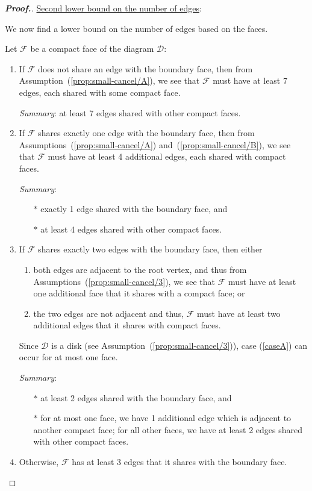 \documentclass[11pt,a4paper,reqno]{amsart}
\theoremstyle{plain}
\theoremstyle{definition}
\theoremstyle{definition}
\newenvironment{myproof}{\begin{proof}[\normalfont\bfseries Proof.]}{\end{proof}}
\begin{document}
\begin{myproof}
	\medskip
	\noindent
	\underline{Second lower bound on the number of edges}:\nopagebreak

	\smallskip\nopagebreak
	\noindent\nopagebreak
	We now find a lower bound on the number of edges based on the faces.

	Let $\mathcal F$ be a compact face of the diagram $\mathcal D$:
	\begin{enumerate}[label=(\roman*),ref=\roman*]
		\item
		      If $\mathcal F$ does not share an edge with the boundary face, then from Assumption~(\ref{prop:small-cancel/A}), we see that $\mathcal F$ must have at least $7$ edges, each shared with some compact face.

		      \smallskip
		      \noindent \textit{Summary}: at least 7 edges shared with other compact faces.
		      \medskip

		\item
		      If $\mathcal F$ shares exactly one edge with the boundary face, then from Assumptions~(\ref{prop:small-cancel/A}) and~(\ref{prop:small-cancel/B}), we see that $\mathcal F$ must have at least 4 additional edges, each shared with compact faces.

		      \smallskip
		      \noindent \textit{Summary}: \begin{itemize}\item[$*$] exactly 1 edge shared with the boundary face, and \item[$*$] at least 4 edges shared with other compact faces.\end{itemize}
		      \medskip
		\item
		      If $\mathcal F$ shares exactly two edges with the boundary face, then either
		      \begin{enumerate}[label=(\alph*), ref=\alph*]
			      \item\label{caseA} both edges are adjacent to the root vertex, and thus from Assumptions~(\ref{prop:small-cancel/3}), we see that $\mathcal F$ must have at least one additional face that it shares with a compact face; or
			      \item the two edges are not adjacent and thus, $\mathcal F$ must have at least two additional edges that it shares with compact faces.
		      \end{enumerate}
		      \noindent
		      Since $\mathcal D$ is a disk (see Assumption~(\ref{prop:small-cancel/3})), case (\ref{caseA}) can occur for at most one face.

		      \smallskip
		      \noindent \textit{Summary}: \begin{itemize}\item[$*$] at least 2 edges shared with the boundary face, and \item[$*$] for at most one face, we have 1 additional edge which is adjacent to another compact face; for all other faces, we have at least 2 edges shared with other compact faces.\end{itemize}
		      \medskip
		\item
		      Otherwise, $\mathcal F$ has at least 3 edges that it shares with the boundary face.


\end{enumerate}
\end{myproof}
\end{document}
